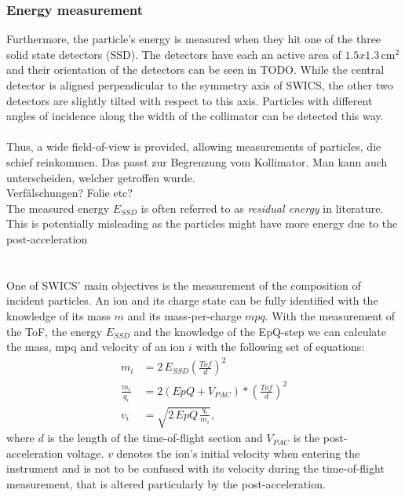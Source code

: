 \subsubsection{Energy measurement}
Furthermore, the particle's energy is measured when they hit one of the three solid state detectors (SSD). The detectors have each an active area of $1.5 x 1.3 \,\mathrm{cm^2}$ and their orientation of the detectors can be seen in TODO. While the central detector is aligned perpendicular to the symmetry axis of SWICS, the other two detectors are slightly tilted with respect to this axis. Particles with different angles of incidence along the width of the collimator can be detected this way.
\\ \\
Thus, a wide field-of-view is provided, allowing measurements of particles, die schief reinkommen. Das passt zur Begrenzung vom Kollimator. Man kann auch unterscheiden, welcher getroffen wurde.\\
Verfälschungen? Folie etc? \\ 
The measured energy $E_{SSD}$ is often referred to as \textit{residual energy} in literature. This is potentially misleading as the particles might have more energy due to the post-acceleration 
\\ \\ \\
One of SWICS' main objectives is the measurement of the composition of incident particles. An ion and its charge state can be fully identified with the knowledge of its mass $m$ and its mass-per-charge $mpq$. 
With the measurement of the ToF, the energy $E_{SSD}$ and the knowledge of the EpQ-step we can calculate the mass, mpq and velocity of an ion $i$ with the following set of equations:
\begin{align}
m_i &= 2\,E_{SSD} \left( \frac{Tof}{d}\right)^2 \label{eq:swics_set1}\\
\frac{m_i}{q_i} &= 2 \left(EpQ + V_{PAC}\right) * \left(\frac{Tof}{d}\right)^2 \label{eq:swics_set2} \\
v_i &= \sqrt{2\,EpQ\,\frac{q_i}{m_i}},
\label{eq:swics_set3}
\end{align}
where $d$ is the length of the time-of-flight section and $V_{PAC}$ is the post-acceleration voltage. $v$ denotes the ion's initial velocity when entering the instrument and is not to be confused with its velocity during the time-of-flight measurement, that is altered particularly by the post-acceleration.